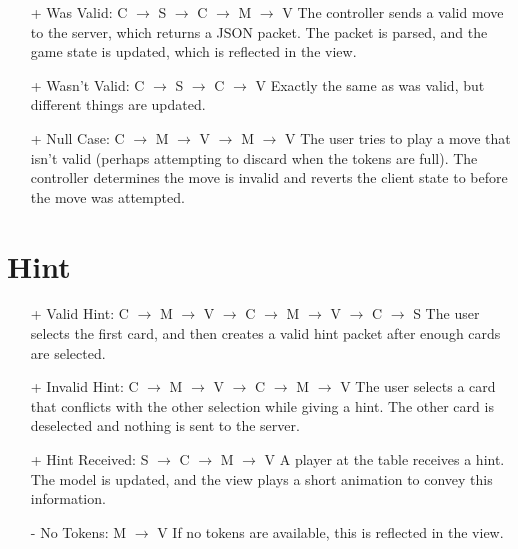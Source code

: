 \documentclass[12pt]{article}
\begin{document}
\begin{itemize}

\item[+] Was Valid: C $\rightarrow$ S $\rightarrow$ C $\rightarrow$ M $\rightarrow$ V \newline
The controller sends a valid move to the server, which returns a JSON packet.  The packet
is parsed, and the game state is updated, which is reflected in the view.
\item[+] Wasn't Valid: C $\rightarrow$ S $\rightarrow$ C $\rightarrow$ V \newline
Exactly the same as was valid, but different things are updated.
\item[+] Null Case: C $\rightarrow$ M $\rightarrow$ V $\rightarrow$ M $\rightarrow$ V \newline
The user tries to play a move that isn't valid (perhaps attempting to discard when the tokens are
full).  The controller determines the move is invalid and reverts the client state to before the
move was attempted.
\end{itemize}

\section{Hint}

\begin{itemize}
\item [+] Valid Hint:  C $\rightarrow$ M $\rightarrow$ V $\rightarrow$ C $\rightarrow$ M 
$\rightarrow$ V $\rightarrow$ C $\rightarrow$ S \newline
The user selects the first card, and then creates a valid hint packet after enough
cards are selected.

\item [+] Invalid Hint: C $\rightarrow$ M $\rightarrow$ V $\rightarrow$ C $\rightarrow$ M 
$\rightarrow$ V \newline
The user selects a card that conflicts with the other selection while giving a hint. The
other card is deselected and nothing is sent to the server.

\item [+] Hint Received: S $\rightarrow$ C $\rightarrow$ M $\rightarrow$ V \newline
A player at the table receives a hint.  The model is updated, and the view plays a short
animation to convey this information.

\item [-] No Tokens: M $\rightarrow$ V
If no tokens are available, this is reflected in the view.

\end{itemize}
\end{document}
